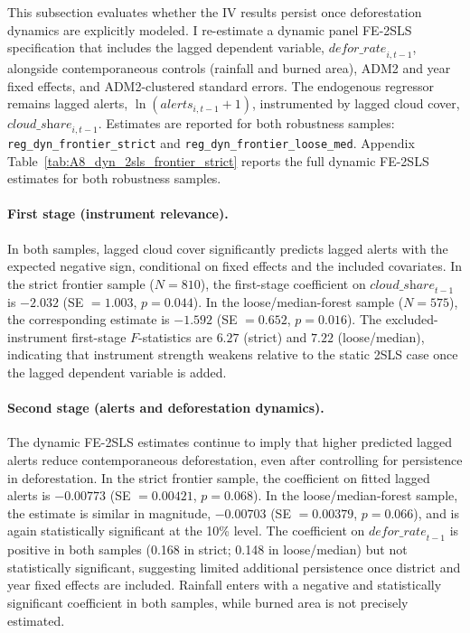 \documentclass[hidelinks,12pt]{article}
\begin{document}
This subsection evaluates whether the IV results persist once deforestation dynamics are explicitly modeled. I re-estimate a dynamic panel FE-2SLS specification that includes the lagged dependent variable, $\textit{defor\_rate}_{i,t-1}$, alongside contemporaneous controls (rainfall and burned area), ADM2 and year fixed effects, and ADM2-clustered standard errors. The endogenous regressor remains lagged alerts, $\ln(\textit{alerts}_{i,t-1}+1)$, instrumented by lagged cloud cover, $\textit{cloud\_share}_{i,t-1}$. Estimates are reported for both robustness samples: \texttt{reg\_dyn\_frontier\_strict} and \texttt{reg\_dyn\_frontier\_loose\_med}. Appendix Table~\ref{tab:A8_dyn_2sls_frontier_strict} reports the full dynamic FE-2SLS estimates for both robustness samples.

\paragraph{First stage (instrument relevance).}
In both samples, lagged cloud cover significantly predicts lagged alerts with the expected negative sign, conditional on fixed effects and the included covariates. In the strict frontier sample ($N=810$), the first-stage coefficient on $\textit{cloud\_share}_{t-1}$ is $-2.032$ (SE $=1.003$, $p=0.044$). In the loose/median-forest sample ($N=575$), the corresponding estimate is $-1.592$ (SE $=0.652$, $p=0.016$). The excluded-instrument first-stage $F$-statistics are $6.27$ (strict) and $7.22$ (loose/median), indicating that instrument strength weakens relative to the static 2SLS case once the lagged dependent variable is added.

\paragraph{Second stage (alerts and deforestation dynamics).}
The dynamic FE-2SLS estimates continue to imply that higher predicted lagged alerts reduce contemporaneous deforestation, even after controlling for persistence in deforestation. In the strict frontier sample, the coefficient on fitted lagged alerts is $-0.00773$ (SE $=0.00421$, $p=0.068$). In the loose/median-forest sample, the estimate is similar in magnitude, $-0.00703$ (SE $=0.00379$, $p=0.066$), and is again statistically significant at the 10\% level. The coefficient on $\textit{defor\_rate}_{t-1}$ is positive in both samples (0.168 in strict; 0.148 in loose/median) but not statistically significant, suggesting limited additional persistence once district and year fixed effects are included. Rainfall enters with a negative and statistically significant coefficient in both samples, while burned area is not precisely estimated.
\end{document}
